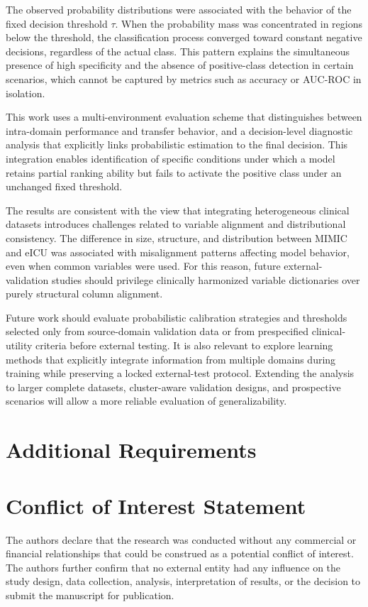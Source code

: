 \documentclass[utf8]{FrontiersinHarvard} %
\begin{document}
The observed probability distributions were associated with the behavior of the fixed decision threshold $\tau$. When the probability mass was concentrated in regions below the threshold, the classification process converged toward constant negative decisions, regardless of the actual class. This pattern explains the simultaneous presence of high specificity and the absence of positive-class detection in certain scenarios, which cannot be captured by metrics such as accuracy or AUC-ROC in isolation.

This work uses a multi-environment evaluation scheme that distinguishes between intra-domain performance and transfer behavior, and a decision-level diagnostic analysis that explicitly links probabilistic estimation to the final decision. This integration enables identification of specific conditions under which a model retains partial ranking ability but fails to activate the positive class under an unchanged fixed threshold.

The results are consistent with the view that integrating heterogeneous clinical datasets introduces challenges related to variable alignment and distributional consistency. The difference in size, structure, and distribution between MIMIC and eICU was associated with misalignment patterns affecting model behavior, even when common variables were used. For this reason, future external-validation studies should privilege clinically harmonized variable dictionaries over purely structural column alignment.

Future work should evaluate probabilistic calibration strategies and thresholds selected only from source-domain validation data or from prespecified clinical-utility criteria before external testing. It is also relevant to explore learning methods that explicitly integrate information from multiple domains during training while preserving a locked external-test protocol. Extending the analysis to larger complete datasets, cluster-aware validation designs, and prospective scenarios will allow a more reliable evaluation of generalizability.



\section{Additional Requirements}
\section*{Conflict of Interest Statement}
The authors declare that the research was conducted without any commercial or financial relationships that could be construed as a potential conflict of interest. The authors further confirm that no external entity had any influence on the study design, data collection, analysis, interpretation of results, or the decision to submit the manuscript for publication.
\end{document}

